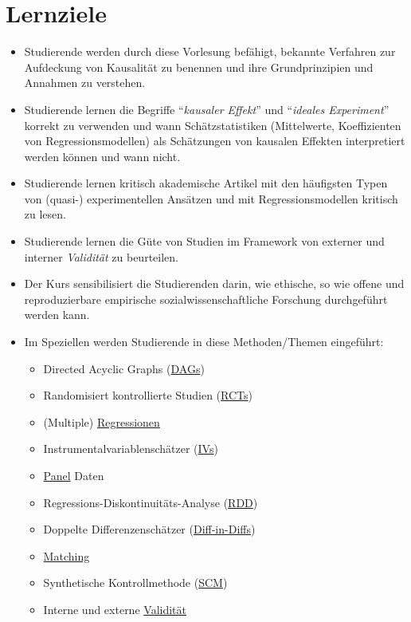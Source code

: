 \documentclass[12pt,a4paper]{article}
\begin{document}
\section{Lernziele}
\begin{itemize}
\item Studierende werden durch diese Vorlesung befähigt, bekannte Verfahren zur Aufdeckung von Kausalität zu benennen und ihre Grundprinzipien und Annahmen zu verstehen. 
\item Studierende lernen die Begriffe ``\textit{kausaler Effekt}'' und ``\textit{ideales Experiment}'' korrekt zu verwenden und wann Schätzstatistiken (Mittelwerte, Koeffizienten von Regressionsmodellen) als Schätzungen von kausalen Effekten interpretiert werden können und wann nicht. \item Studierende lernen kritisch akademische Artikel mit den häufigsten Typen von (quasi-) experimentellen Ansätzen und mit Regressionsmodellen kritisch zu lesen. 
\item Studierende lernen die Güte von Studien im Framework von externer und interner \textit{Validität} zu beurteilen. 
\item Der Kurs sensibilisiert die Studierenden darin, wie ethische, so wie offene und reproduzierbare empirische sozialwissenschaftliche Forschung durchgeführt werden kann. \newline
\item Im Speziellen werden Studierende in diese Methoden/Themen eingeführt: 
\begin{itemize}
\item Directed Acyclic Graphs (\hyperref[ses:2]{DAGs})
\item Randomisiert kontrollierte Studien (\hyperref[ses:3]{RCTs})
\item (Multiple) \hyperref[ses:4]{Regressionen} 
\item Instrumentalvariablenschätzer (\hyperref[ses:5]{IVs})
\item \hyperref[ses:6]{Panel} Daten
\item Regressions-Diskontinuitäts-Analyse (\hyperref[ses:7]{RDD})
\item Doppelte Differenzenschätzer (\hyperref[ses:8]{Diff-in-Diffs})
\item \hyperref[ses:10]{Matching} 
\item Synthetische Kontrollmethode (\hyperref[ses:11]{SCM})
\item Interne und externe \hyperref[ses:12]{Validität} 
\end{itemize}
\end{itemize}
\end{document}
